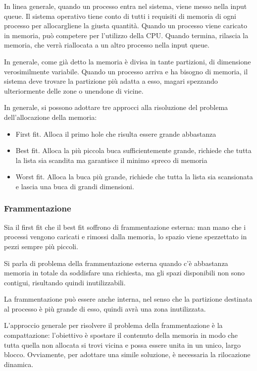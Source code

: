\documentclass[a4paper]{article}
\begin{document}
In linea generale, quando un processo entra nel sistema, viene messo nella input queue. Il sistema operativo tiene conto di tutti i requisiti di memoria di ogni processo per allocargliene la giusta quantità. Quando un processo viene caricato in memoria, può competere per l'utilizzo della CPU. Quando termina, rilascia la memoria, che verrà riallocata a un altro processo nella input queue.

In generale, come già detto la memoria è divisa in tante partizioni, di dimensione verosimilmente variabile. Quando un processo arriva e ha bisogno di memoria, il sistema deve trovare la partizione più adatta a esso, magari spezzando ulteriormente delle zone o unendone di vicine.

In generale, si possono adottare tre approcci alla risoluzione del problema dell'allocazione della memoria:
\begin{itemize}
   \item First fit. Alloca il primo hole che risulta essere grande abbastanza
   \item Best fit. Alloca la più piccola buca sufficientemente grande, richiede che tutta la lista sia scandita ma garantisce il minimo spreco di memoria
   \item Worst fit. Alloca la buca più grande, richiede che tutta la lista sia scansionata e lascia una buca di grandi dimensioni.
\end{itemize}

\subsubsection{Frammentazione}
Sia il first fit che il best fit soffrono di frammentazione esterna: man mano che i processi vengono caricati e rimossi dalla memoria, lo spazio viene spezzettato in pezzi sempre più piccoli.

Si parla di problema della frammentazione esterna quando c'è abbastanza memoria in totale da soddisfare una richiesta, ma gli spazi disponibili non sono contigui, risultando quindi inutilizzabili.

La frammentazione può essere anche interna, nel senso che la partizione destinata al processo è più grande di esso, quindi avrà una zona inutilizzata.

L'approccio generale per risolvere il problema della frammentazione è la compattazione: l'obiettivo è spostare il contenuto della memoria in modo che tutta quella non allocata si trovi vicina e possa essere unita in un unico, largo blocco. Ovviamente, per adottare una simile soluzione, è necessaria la rilocazione dinamica.
\end{document}
